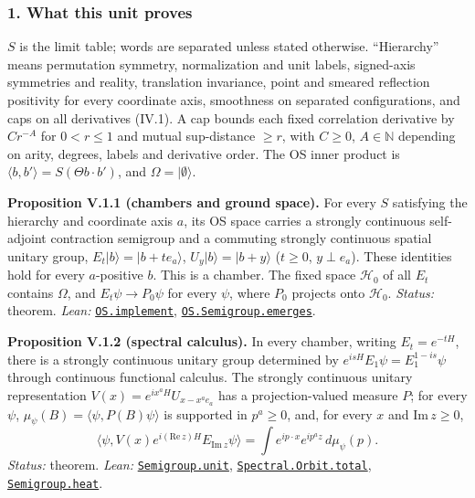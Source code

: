 \documentclass[
  letterpaper,
  11pt]{article}
\begin{document}
\subsubsection{1. What this unit proves}\label{what-this-unit-proves-20}

\(S\) is the limit table; words are separated unless stated otherwise.
``Hierarchy'' means permutation symmetry, normalization and unit labels,
signed-axis symmetries and reality, translation invariance, point and
smeared reflection positivity for every coordinate axis, smoothness on
separated configurations, and caps on all derivatives (IV.1). A cap
bounds each fixed correlation derivative by \(Cr^{-A}\) for \(0<r\le1\)
and mutual sup-distance \(\ge r\), with \(C\ge0\), \(A\in\mathbb N\)
depending on arity, degrees, labels and derivative order. The OS inner
product is \(\langle b,b'\rangle=S(\Theta b\cdot b')\), and
\(\Omega=|\emptyset\rangle\).

\textbf{Proposition V.1.1 (chambers and ground space).} For every \(S\)
satisfying the hierarchy and coordinate axis \(a\), its OS space carries
a strongly continuous self-adjoint contraction semigroup and a commuting
strongly continuous spatial unitary group,
\(E_t|b\rangle=|b+te_a\rangle\), \(U_y|b\rangle=|b+y\rangle\)
(\(t\ge0\), \(y\perp e_a\)). These identities hold for every
\(a\)-positive \(b\). This is a chamber. The fixed space
\(\mathcal H_0\) of all \(E_t\) contains \(\Omega\), and
\(E_t\psi\to P_0\psi\) for every \(\psi\), where \(P_0\) projects onto
\(\mathcal H_0\). \emph{Status:} theorem. \emph{Lean:}
\href{https://github.com/yang-mills-group/OpenAI-YM-20261028/blob/3456e5e75cf8d4cd558955a5c7638fba2d68f464/YM/OS/Dynamics.lean\#L63-L104}{\texttt{OS.implement}},
\href{https://github.com/yang-mills-group/OpenAI-YM-20261028/blob/3456e5e75cf8d4cd558955a5c7638fba2d68f464/YM/OS/Core.lean\#L38-L78}{\texttt{OS.Semigroup.emerges}}.

\textbf{Proposition V.1.2 (spectral calculus).} In every chamber,
writing \(E_t=e^{-tH}\), there is a strongly continuous unitary group
determined by \(e^{isH}E_1\psi=E_1^{1-is}\psi\) through continuous
functional calculus. The strongly continuous unitary representation
\(V(x)=e^{ix^aH}U_{x-x^ae_a}\) has a projection-valued measure \(P\);
for every \(\psi\), \(\mu_\psi(B)=\langle\psi,P(B)\psi\rangle\) is
supported in \(p^a\ge0\), and, for every \(x\) and
\(\mathrm{Im}\,z\ge0\),
\[\langle\psi,V(x)e^{i(\mathrm{Re}\,z)H}E_{\mathrm{Im}\,z}\psi\rangle=\int e^{ip\cdot x}e^{ip^az}\,d\mu_\psi(p).\]
\emph{Status:} theorem. \emph{Lean:}
\href{https://github.com/yang-mills-group/OpenAI-YM-20261028/blob/3456e5e75cf8d4cd558955a5c7638fba2d68f464/YM/Heat/Lift.lean\#L50-L58}{\texttt{Semigroup.unit}},
\href{https://github.com/yang-mills-group/OpenAI-YM-20261028/blob/3456e5e75cf8d4cd558955a5c7638fba2d68f464/YM/SNAG/Escape.lean\#L52-L119}{\texttt{Spectral.Orbit.total}},
\href{https://github.com/yang-mills-group/OpenAI-YM-20261028/blob/3456e5e75cf8d4cd558955a5c7638fba2d68f464/YM/Heat/Lift.lean\#L108-L114}{\texttt{Semigroup.heat}}.
\end{document}
